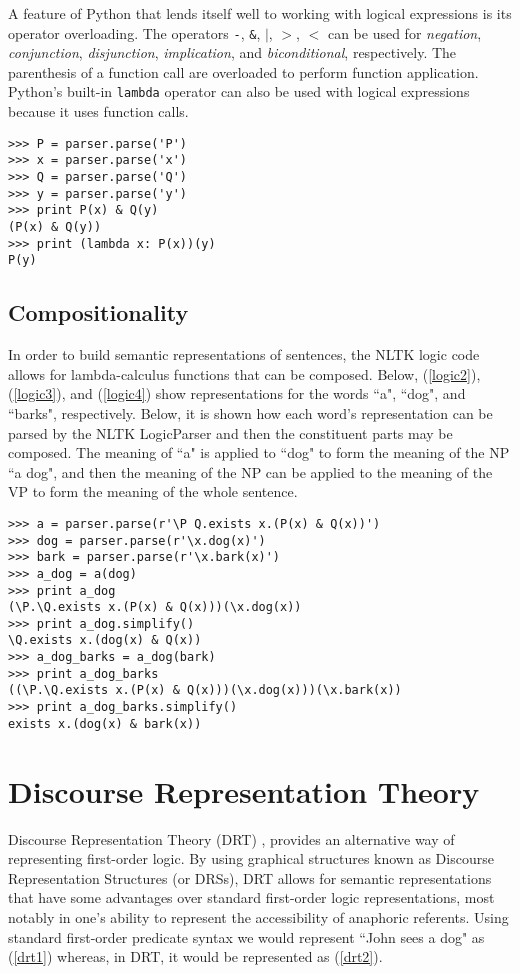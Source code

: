 \documentclass{article}
\newcommand{\dhgcode}[1]{{\tt #1}}
\begin{document}
A feature of Python that lends itself well to working with logical expressions is its operator overloading.  The operators \dhgcode{-}, \dhgcode{\&}, \dhgcode{$|$}, \dhgcode{$>$}, \dhgcode{$<$} can be used for \emph{negation}, \emph{conjunction}, \emph{disjunction}, \emph{implication}, and \emph{biconditional}, respectively.  The parenthesis of a function call are overloaded to perform function application.  Python's built-in \dhgcode{lambda} operator can also be used with logical expressions because it uses function calls.

\begin{verbatim}
>>> P = parser.parse('P')
>>> x = parser.parse('x')
>>> Q = parser.parse('Q')
>>> y = parser.parse('y')
>>> print P(x) & Q(y)
(P(x) & Q(y))
>>> print (lambda x: P(x))(y)
P(y)
\end{verbatim}


\subsection{Compositionality}
In order to build semantic representations of sentences, the NLTK logic code allows for lambda-calculus functions that can be composed.  Below, (\ref{logic2}), (\ref{logic3}), and (\ref{logic4}) show representations for the words ``a", ``dog", and ``barks", respectively.  Below, it is shown how each word's representation can be parsed by the NLTK LogicParser and then the constituent parts may be composed.  The meaning of ``a" is applied to ``dog" to form the meaning of the NP ``a dog", and then the meaning of the NP can be applied to the meaning of the VP to form the meaning of the whole sentence.


\begin{verbatim}
>>> a = parser.parse(r'\P Q.exists x.(P(x) & Q(x))')
>>> dog = parser.parse(r'\x.dog(x)')
>>> bark = parser.parse(r'\x.bark(x)')
>>> a_dog = a(dog)
>>> print a_dog
(\P.\Q.exists x.(P(x) & Q(x)))(\x.dog(x))
>>> print a_dog.simplify()
\Q.exists x.(dog(x) & Q(x))
>>> a_dog_barks = a_dog(bark)
>>> print a_dog_barks
((\P.\Q.exists x.(P(x) & Q(x)))(\x.dog(x)))(\x.bark(x))
>>> print a_dog_barks.simplify()
exists x.(dog(x) & bark(x))
\end{verbatim}


\section{Discourse Representation Theory}
Discourse Representation Theory (DRT) \cite{KampReyle}, provides an alternative way of representing first-order logic.  By using graphical structures known as Discourse Representation Structures (or DRSs), DRT allows for semantic representations that have some advantages over standard first-order logic representations, most notably in one's ability to represent the accessibility of anaphoric referents.  Using standard first-order predicate syntax we would represent ``John sees a dog" as (\ref{drt1}) whereas, in DRT, it would be represented as (\ref{drt2}).
\end{document}
